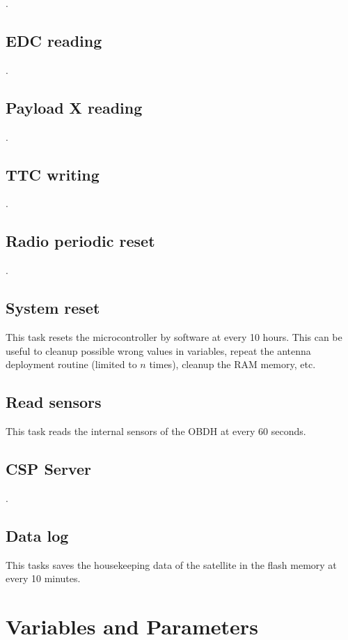 .

\subsection{EDC reading}

.

\subsection{Payload X reading}

.

\subsection{TTC writing}

.

\subsection{Radio periodic reset}

.

\subsection{System reset}

This task resets the microcontroller by software at every 10 hours. This can be useful to cleanup possible wrong values in variables, repeat the antenna deployment routine (limited to $n$ times), cleanup the RAM memory, etc.

\subsection{Read sensors}

This task reads the internal sensors of the OBDH at every 60 seconds.

\subsection{CSP Server}

.


\subsection{Data log}

This tasks saves the housekeeping data of the satellite in the flash memory at every 10 minutes.

\section{Variables and Parameters}


